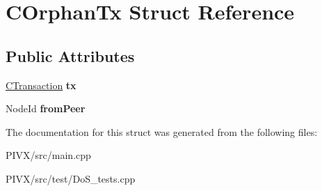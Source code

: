 \hypertarget{struct_c_orphan_tx}{}\section{C\+Orphan\+Tx Struct Reference}
\label{struct_c_orphan_tx}
\subsection*{Public Attributes}
\begin{DoxyCompactItemize}
\item 
\mbox{\label{struct_c_orphan_tx_aa797568f3a1168e96d3c51601eda5fdc}} 
\mbox{\hyperlink{class_c_transaction}{C\+Transaction}} {\bfseries tx}
\item 
\mbox{\label{struct_c_orphan_tx_a06fa313a474fd4e6d0ed20bda7cbe69c}} 
Node\+Id {\bfseries from\+Peer}
\end{DoxyCompactItemize}


The documentation for this struct was generated from the following files\+:\begin{DoxyCompactItemize}
\item 
P\+I\+V\+X/src/main.\+cpp\item 
P\+I\+V\+X/src/test/Do\+S\+\_\+tests.\+cpp\end{DoxyCompactItemize}
